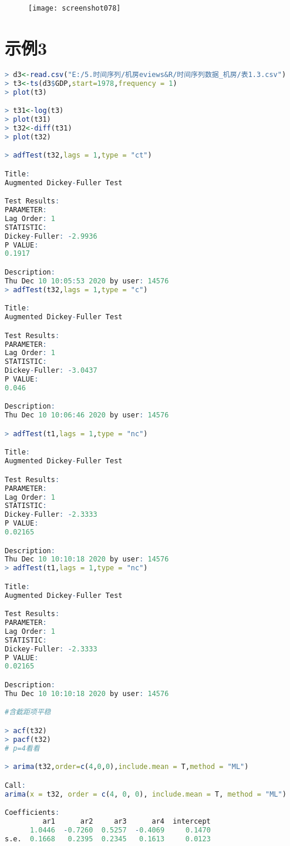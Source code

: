 \documentclass[11pt,a4paper,oneside]{book}
\begin{document}
\begin{figure}[H]
	\centering
	\texttt{[image: screenshot078]}
	\label{fig:screenshot078}
\end{figure}
\section{示例3}
\begin{lstlisting}[language=r]
> d3<-read.csv("E:/5.时间序列/机房eviews&R/时间序列数据_机房/表1.3.csv")
> t3<-ts(d3$GDP,start=1978,frequency = 1)
> plot(t3)

> t31<-log(t3)
> plot(t31)
> t32<-diff(t31)
> plot(t32)

> adfTest(t32,lags = 1,type = "ct")

Title:
Augmented Dickey-Fuller Test

Test Results:
PARAMETER:
Lag Order: 1
STATISTIC:
Dickey-Fuller: -2.9936
P VALUE:
0.1917 

Description:
Thu Dec 10 10:05:53 2020 by user: 14576
> adfTest(t32,lags = 1,type = "c")

Title:
Augmented Dickey-Fuller Test

Test Results:
PARAMETER:
Lag Order: 1
STATISTIC:
Dickey-Fuller: -3.0437
P VALUE:
0.046 

Description:
Thu Dec 10 10:06:46 2020 by user: 14576

> adfTest(t1,lags = 1,type = "nc")

Title:
Augmented Dickey-Fuller Test

Test Results:
PARAMETER:
Lag Order: 1
STATISTIC:
Dickey-Fuller: -2.3333
P VALUE:
0.02165 

Description:
Thu Dec 10 10:10:18 2020 by user: 14576
> adfTest(t1,lags = 1,type = "nc")

Title:
Augmented Dickey-Fuller Test

Test Results:
PARAMETER:
Lag Order: 1
STATISTIC:
Dickey-Fuller: -2.3333
P VALUE:
0.02165 

Description:
Thu Dec 10 10:10:18 2020 by user: 14576

#含截距项平稳

> acf(t32)
> pacf(t32)
# p=4看看

> arima(t32,order=c(4,0,0),include.mean = T,method = "ML")

Call:
arima(x = t32, order = c(4, 0, 0), include.mean = T, method = "ML")

Coefficients:
         ar1      ar2     ar3      ar4  intercept
      1.0446  -0.7260  0.5257  -0.4069     0.1470
s.e.  0.1668   0.2395  0.2345   0.1613     0.0123


\end{lstlisting}
\end{document}
